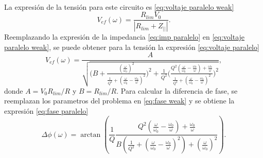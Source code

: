 \paragraph{}
La expresión de la tensión para este circuito es \eqref{eq:voltaje paralelo weak}
\begin{equation}\label{eq:voltaje paralelo weak}
    V_{ef}(\omega) = \frac{R_{lim}V_0}{|R_{lim} + Z_{||}|}.
\end{equation}
Reemplazando la expresión de la impedancia \eqref{eq:imp paralelo} en \eqref{eq:voltaje paralelo weak}, se puede obtener para la tensión la expresión \eqref{eq:voltaje paralelo}
\begin{equation}\label{eq:voltaje paralelo}
    V_{ef}(\omega) = \frac{A}{\sqrt{\big(
    B + \frac{(\frac{\omega}{\omega_0})^2}{\frac{1}{Q^2}+(\frac{\omega}{\omega_0} - \frac{\omega_0}{\omega})^2}
    \big)^2 + \frac{1}{Q^2}\big(
    \frac{Q^2(\frac{\omega}{\omega_0} - \frac{\omega_0}{\omega}) +  \frac{\omega_0}{\omega}}{\frac{1}{Q^2}+(\frac{\omega}{\omega_0} - \frac{\omega_0}{\omega})^2}\big)^2}},
\end{equation}
donde $A = V_0 R_{lim}/R$ y $B = R_{lim}/R$. Para calcular la diferencia de fase, se reemplazan los parametros del problema en \eqref{eq:fase weak} y se obtiene la expresión \eqref{eq:fase paralelo}
\begin{equation}\label{eq:fase paralelo}
    \Delta\phi(\omega) = \arctan\left(\frac{1}{Q}\frac{
    Q^2(\frac{\omega}{\omega_0} - \frac{\omega_0}{\omega}) +  \frac{\omega_0}{\omega}
    }{
    B(\frac{1}{Q^2} + (\frac{\omega}{\omega_0} - \frac{\omega_0}{\omega})^2) + (\frac{\omega}{\omega_0})^2
    }\right).
\end{equation}
